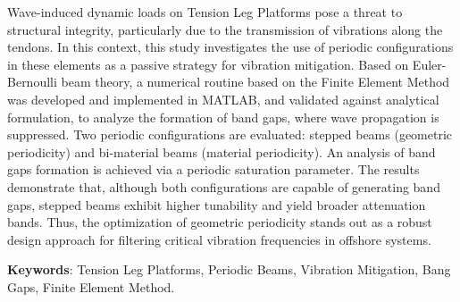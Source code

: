 \makeatletter
    \setlength{\absparsep}{18pt}
\makeatother

\begin{center}
    \textbf{\abstractitle}
\end{center}
\vspace{.5cm}

\noindent
Wave-induced dynamic loads on Tension Leg Platforms pose a threat to structural integrity, particularly due to the transmission of vibrations along the tendons. In this context, this study investigates the use of periodic configurations in these elements as a passive strategy for vibration mitigation. Based on Euler-Bernoulli beam theory, a numerical routine based on the Finite Element Method was developed and implemented in MATLAB, and validated against analytical formulation, to analyze the formation of band gaps, where wave propagation is suppressed. Two periodic configurations are evaluated: stepped beams (geometric periodicity) and bi-material beams (material periodicity). An analysis of band gaps formation is achieved via a periodic saturation parameter. The results demonstrate that, although both configurations are capable of generating band gaps, stepped beams exhibit higher tunability and yield broader attenuation bands. Thus, the optimization of geometric periodicity stands out as a robust design approach for filtering critical vibration frequencies in offshore systems.

\vspace{18pt}\noindent\textbf{Keywords}: Tension Leg Platforms, Periodic Beams, Vibration Mitigation, Bang Gaps, Finite Element Method.